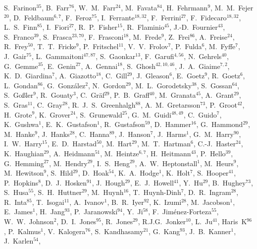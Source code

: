 \documentclass[12pt]{iopart}
\begin{document}
{S.~Farinon$^{35}$, 
B.~Farr$^{76}$, 
W.~M.~Farr$^{24}$, 
M.~Favata$^{84}$, 
H.~Fehrmann$^{9}$, 
M.~M.~Fejer$^{20}$, 
D.~Feldbaum$^{6,7}$, 
F.~Feroz$^{75}$, 
I.~Ferrante$^{18,32}$, 
F.~Ferrini$^{27}$, 
F.~Fidecaro$^{18,32}$, 
L.~S.~Finn$^{85}$, 
I.~Fiori$^{27}$, 
R.~P.~Fisher$^{15}$, 
R.~Flaminio$^{45}$, 
J.-D.~Fournier$^{43}$, 
S.~Franco$^{39}$, 
S.~Frasca$^{23,70}$, 
F.~Frasconi$^{18}$, 
M.~Frede$^{9}$, 
Z.~Frei$^{86}$, 
A.~Freise$^{24}$, 
R.~Frey$^{50}$, 
T.~T.~Fricke$^{9}$, 
P.~Fritschel$^{11}$, 
V.~V.~Frolov$^{7}$, 
P.~Fulda$^{6}$, 
M.~Fyffe$^{7}$, 
J.~Gair$^{75}$, 
L.~Gammaitoni$^{47,87}$, 
S.~Gaonkar$^{13}$, 
F.~Garufi$^{4,56}$, 
N.~Gehrels$^{40}$, 
G.~Gemme$^{35}$, 
E.~Genin$^{27}$, 
A.~Gennai$^{18}$, 
S.~Ghosh$^{42,10,46}$, 
J.~A.~Giaime$^{7,2}$, 
K.~D.~Giardina$^{7}$, 
A.~Giazotto$^{18}$, 
C.~Gill$^{29}$, 
J.~Gleason$^{6}$, 
E.~Goetz$^{9}$, 
R.~Goetz$^{6}$, 
L.~Gondan$^{86}$, 
G.~Gonz\'alez$^{2}$, 
N.~Gordon$^{29}$, 
M.~L.~Gorodetsky$^{38}$, 
S.~Gossan$^{64}$, 
S.~Go{\ss}ler$^{9}$, 
R.~Gouaty$^{3}$, 
C.~Gr\"af$^{29}$, 
P.~B.~Graff$^{40}$, 
M.~Granata$^{45}$, 
A.~Grant$^{29}$, 
S.~Gras$^{11}$, 
C.~Gray$^{28}$, 
R.~J.~S.~Greenhalgh$^{88}$, 
A.~M.~Gretarsson$^{73}$, 
P.~Groot$^{42}$, 
H.~Grote$^{9}$, 
K.~Grover$^{24}$, 
S.~Grunewald$^{25}$, 
G.~M.~Guidi$^{48,49}$, 
C.~Guido$^{7}$, 
K.~Gushwa$^{1}$, 
E.~K.~Gustafson$^{1}$, 
R.~Gustafson$^{59}$, 
D.~Hammer$^{16}$, 
G.~Hammond$^{29}$, 
M.~Hanke$^{9}$, 
J.~Hanks$^{28}$, 
C.~Hanna$^{89}$, 
J.~Hanson$^{7}$, 
J.~Harms$^{1}$, 
G.~M.~Harry$^{90}$, 
I.~W.~Harry$^{15}$, 
E.~D.~Harstad$^{50}$, 
M.~Hart$^{29}$, 
M.~T.~Hartman$^{6}$, 
C.-J.~Haster$^{24}$, 
K.~Haughian$^{29}$, 
A.~Heidmann$^{51}$, 
M.~Heintze$^{6,7}$, 
H.~Heitmann$^{43}$, 
P.~Hello$^{39}$, 
G.~Hemming$^{27}$, 
M.~Hendry$^{29}$, 
I.~S.~Heng$^{29}$, 
A.~W.~Heptonstall$^{1}$, 
M.~Heurs$^{9}$, 
M.~Hewitson$^{9}$, 
S.~Hild$^{29}$, 
D.~Hoak$^{54}$, 
K.~A.~Hodge$^{1}$, 
K.~Holt$^{7}$, 
S.~Hooper$^{41}$, 
P.~Hopkins$^{8}$, 
D.~J.~Hosken$^{91}$, 
J.~Hough$^{29}$, 
E.~J.~Howell$^{41}$, 
Y.~Hu$^{29}$, 
B.~Hughey$^{73}$, 
S.~Husa$^{55}$, 
S.~H.~Huttner$^{29}$, 
M.~Huynh$^{16}$, 
T.~Huynh-Dinh$^{7}$, 
D.~R.~Ingram$^{28}$, 
R.~Inta$^{85}$, 
T.~Isogai$^{11}$, 
A.~Ivanov$^{1}$, 
B.~R.~Iyer$^{92}$, 
K.~Izumi$^{28}$, 
M.~Jacobson$^{1}$, 
E.~James$^{1}$, 
H.~Jang$^{93}$, 
P.~Jaranowski$^{94}$, 
Y.~Ji$^{58}$, 
F.~Jim\'enez-Forteza$^{55}$, 
W.~W.~Johnson$^{2}$, 
D.~I.~Jones$^{95}$, 
R.~Jones$^{29}$, 
R.J.G.~Jonker$^{10}$, 
L.~Ju$^{41}$, 
Haris~K$^{96}$, 
P.~Kalmus$^{1}$, 
V.~Kalogera$^{76}$, 
S.~Kandhasamy$^{21}$, 
G.~Kang$^{93}$, 
J.~B.~Kanner$^{1}$, 
J.~Karlen$^{54}$, 
}
\end{document}
